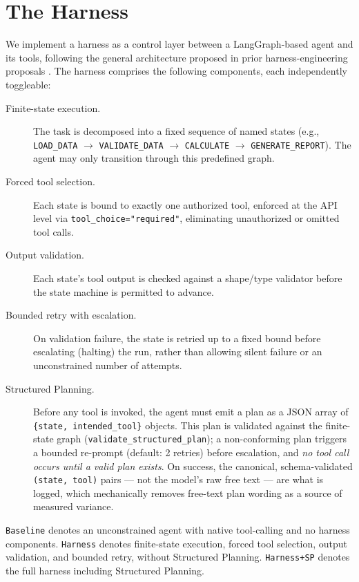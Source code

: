\documentclass[11pt]{article}
\begin{document}
\section{The Harness}
\label{sec:harness}

We implement a harness as a control layer between a LangGraph-based agent and its tools, following the general architecture proposed in prior harness-engineering proposals \cite{harnessproposal}. The harness comprises the following components, each independently toggleable:

\begin{description}
\item[Finite-state execution.] The task is decomposed into a fixed sequence of named states (e.g., \texttt{LOAD\_DATA} $\rightarrow$ \texttt{VALIDATE\_DATA} $\rightarrow$ \texttt{CALCULATE} $\rightarrow$ \texttt{GENERATE\_REPORT}). The agent may only transition through this predefined graph.
\item[Forced tool selection.] Each state is bound to exactly one authorized tool, enforced at the API level via \texttt{tool\_choice=\allowbreak"required"}, eliminating unauthorized or omitted tool calls.
\item[Output validation.] Each state's tool output is checked against a shape/type validator before the state machine is permitted to advance.
\item[Bounded retry with escalation.] On validation failure, the state is retried up to a fixed bound before escalating (halting) the run, rather than allowing silent failure or an unconstrained number of attempts.
\item[Structured Planning.] Before any tool is invoked, the agent must emit a plan as a JSON array of \texttt{\{state, intended\_tool\}} objects. This plan is validated against the finite-state graph (\texttt{validate\_structured\_plan}); a non-conforming plan triggers a bounded re-prompt (default: 2 retries) before escalation, and \emph{no tool call occurs until a valid plan exists}. On success, the canonical, schema-validated \texttt{(state, tool)} pairs --- not the model's raw free text --- are what is logged, which mechanically removes free-text plan wording as a source of measured variance.
\end{description}

\texttt{Baseline} denotes an unconstrained agent with native tool-calling and no harness components. \texttt{Harness} denotes finite-state execution, forced tool selection, output validation, and bounded retry, without Structured Planning. \texttt{Harness+SP} denotes the full harness including Structured Planning.
\end{document}
